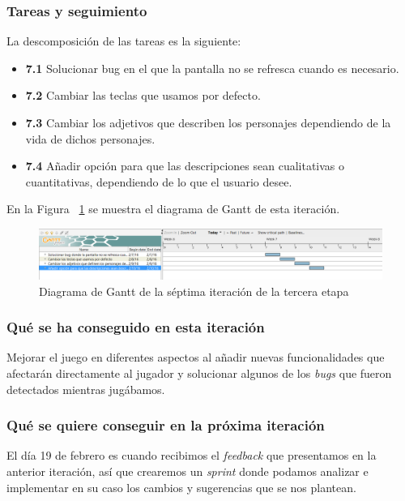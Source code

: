 \subsubsection{Tareas y seguimiento}

La descomposición de las tareas es la siguiente:

\begin{itemize}
  \item \textbf{7.1} Solucionar bug en el que la pantalla no se refresca cuando es necesario.
  \item \textbf{7.2} Cambiar las teclas que usamos por defecto.
  \item \textbf{7.3} Cambiar los adjetivos que describen los personajes dependiendo de la vida de dichos personajes.
  \item \textbf{7.4} Añadir opción para que las descripciones sean cualitativas o cuantitativas, dependiendo de lo que el usuario desee.
\end{itemize}


\noindent En la Figura ~\ref{fig:sec3it7} se muestra el diagrama de Gantt de esta iteración.

\begin{figure}
    \includegraphics[width=\textwidth,height=\textheight,keepaspectratio]{./img/sec3it7.png}
  \caption{Diagrama de Gantt de la séptima iteración de la tercera etapa}
  \label{fig:sec3it7}
\end{figure}

\subsubsection{Qué se ha conseguido en esta iteración}

Mejorar el juego en diferentes aspectos al añadir nuevas funcionalidades que afectarán directamente al jugador y solucionar algunos de los \textit{bugs} que fueron detectados mientras jugábamos.

\subsubsection{Qué se quiere conseguir en la próxima iteración}

El día 19 de febrero es cuando recibimos el \textit{feedback} que presentamos en la anterior iteración, así que crearemos un \textit{sprint} donde podamos analizar e implementar en su caso los cambios y sugerencias que se nos plantean.

